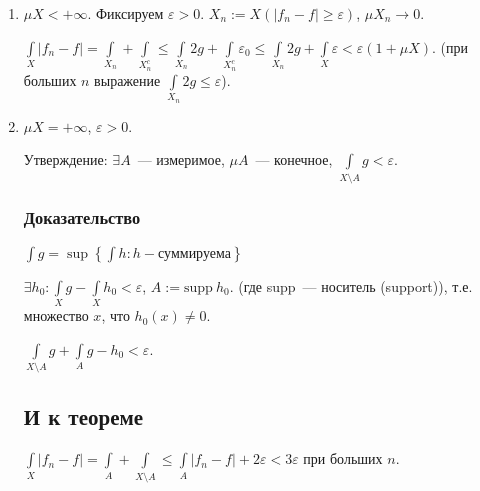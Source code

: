 \documentclass{article}
\begin{document}
            \begin{enumerate}
                
                \item $\mu X < +\infty$. Фиксируем $\varepsilon > 0$. $X_n := X(|f_n - f| \geqslant \varepsilon)$, $\mu X_n \rightarrow 0$.
                    
                    $\int\limits_X |f_n - f| = \int\limits_{X_n} + \int\limits_{X_n^c} \leqslant \int\limits_{X_n} 2g + \int\limits_{X_n^c} \varepsilon_0 \leqslant \int\limits_{X_n} 2g + \int\limits_X \varepsilon < \varepsilon (1 + \mu X)$. (при больших $n$ выражение $\int\limits_{X_n} 2g \leqslant \varepsilon$).
                        
                \item $\mu X = +\infty$, $\varepsilon > 0$. 
                    
                    Утверждение: $\exists A$~--- измеримое, $\mu A$~--- конечное, $\int\limits_{X \setminus A} g < \varepsilon$.
                    
                    \subsubsection{Доказательство}
                        
                        $\int g = \sup \left\{ \int h : h - \text{суммируема} \right\}$
                            
                        $\exists h_0 : \int\limits_X g - \int\limits_X h_0 < \varepsilon$, $A := \mathrm{supp \ } h_0$. (где supp~--- носитель (support)), т.е. множество $x$, что $h_0(x) \neq 0$.
                        
                        $\int\limits_{X \setminus A} g + \int\limits_A g - h_0 < \varepsilon$.
                        
                    \subsection{И к теореме}
                        
                        $\int\limits_X |f_n - f| = \int\limits_A + \int\limits_{X \setminus A} \leqslant \int\limits_A |f_n - f| + 2 \varepsilon < 3 \varepsilon$ при больших $n$.
                        
                \end{enumerate}
       
    \newpage
    
\end{document}
